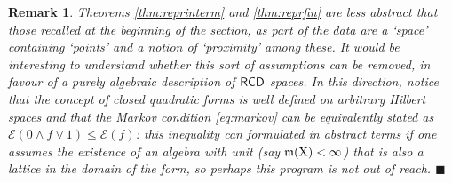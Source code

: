 \documentclass[11pt]{article}
\numberwithin{equation}{section}
\newtheorem{remark}[theorem]{Remark}
\newcommand{\X}{{\rm X}}
\newcommand{\mm}{{\mathfrak m}}
\newcommand{\RCD}{{\sf RCD}}
\newcommand{\fr}{\penalty-20\null\hfill$\blacksquare$}         %
\begin{document}
\begin{remark}{\rm
Theorems \ref{thm:reprinterm} and \ref{thm:reprfin} are less abstract that those recalled at the beginning of the section, as part of the data are a `space' containing `points' and a notion of `proximity' among these. It would be interesting to understand whether this sort of assumptions can be removed, in favour of a purely algebraic description of $\RCD$ spaces. In this direction, notice that the concept of closed quadratic forms is well defined on arbitrary Hilbert spaces and that the Markov condition \eqref{eq:markov} can be equivalently stated as $\mathcal E(0\wedge f\vee 1)\leq\mathcal E(f)$: this inequality can formulated in abstract terms if one assumes the existence of an algebra with unit (say $\mm(\X)<\infty$) that is also a lattice in the domain of the form, so perhaps this program is not out of reach. 
}\fr\end{remark}
\end{document}

